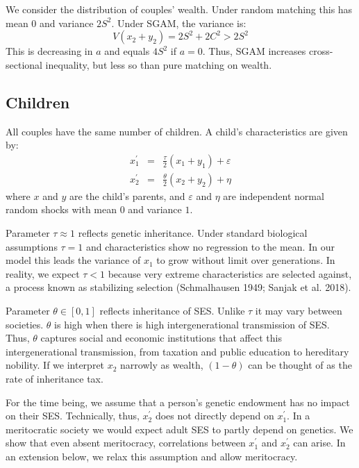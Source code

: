 \documentclass[
]{article}
\theoremstyle{definition}
\theoremstyle{definition}
\theoremstyle{definition}
\theoremstyle{definition}
\theoremstyle{remark}
\begin{document}
We consider the distribution of couples' wealth. Under random matching this has
mean \(0\) and variance \(2S^2\). Under SGAM, the variance is:
\[
V(x_{2}+y_{2}) = 2S^{2} + 2C^{2} > 2S^{2} 
\]
This is decreasing in \(a\) and equals \(4S^2\) if \(a = 0\). Thus, SGAM increases
cross-sectional inequality, but less so than pure matching on wealth.

\hypertarget{children}{%
\subsection{Children}\label{children}}

All couples have the same number of children. A child's characteristics are
given by:
\begin{eqnarray}
x_{1}^{\prime } &=&\frac{\tau }{2}\left( x_{1}+y_{1}\right) +\varepsilon
\label{Chil} \\
x_{2}^{\prime } &=&\frac{\theta }{2}\left( x_{2}+y_{2}\right) +\eta 
\nonumber
\end{eqnarray}
where \(x\) and \(y\) are the child's parents, and \(\varepsilon\) and \(\eta\) are
independent normal random shocks with mean \(0\) and variance \(1\).

Parameter \(\tau \approx 1\) reflects genetic inheritance. Under standard biological
assumptions \(\tau = 1\) and characteristics show no regression to the mean. In our
model this leads the variance of \(x_1\) to grow without limit over generations.
In reality, we expect \(\tau < 1\) because very extreme characteristics are
selected against, a process known as stabilizing selection
(Schmalhausen 1949; Sanjak et al. 2018).

Parameter \(\theta \in [0, 1]\) reflects inheritance of SES. Unlike \(\tau\) it may vary
between societies. \(\theta\) is high when there is high intergenerational
transmission of SES. Thus, \(\theta\) captures social and economic institutions
that affect this intergenerational transmission, from taxation and
public education to hereditary nobility. If we interpret \(x_2\) narrowly as
wealth, \((1 - \theta)\) can be thought of as the rate of inheritance tax.

For the time being, we assume that a person's genetic endowment has no impact on
their SES. Technically, thus, \(x_{2}^\prime\) does not directly depend on
\(x_{1}^\prime\). In a meritocratic society we would expect adult SES to partly depend
on genetics. We show that even absent meritocracy, correlations between \(x_1^\prime\) and
\(x_{2}^\prime\) can arise. In an extension below, we relax this assumption and allow
meritocracy.
\end{document}
